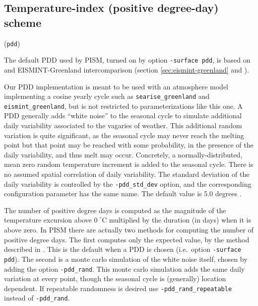 \documentclass[titlepage,letterpaper,final]{scrartcl}
\newcommand{\intextoption}[1]{\texttt{-#1}\optindex{\texttt{-#1}}}
\begin{document}
\subsection{Temperature-index (positive degree-day) scheme}
\label{sec:temp-index-posit}

(\texttt{pdd})     

The default PDD used by PISM, turned on by option \texttt{-surface pdd}, is
based on \cite{CalovGreve05} and EISMINT-Greenland intercomparison (section
\ref{sec:eismint-greenland} and \cite{RitzEISMINT}).

Our PDD implementation is meant to be used with an atmosphere model
implementing a cosine yearly cycle such as \texttt{searise_greenland} and
\texttt{eismint_greenland}, but is not restricted to parameterizations like
this one. A PDD generally adds ``white noise'' to the seasonal cycle to
simulate additional daily variability associated to the vagaries of weather.
This additional random variation is quite significant, as the seasonal cycle
may never reach the melting point but that point may be reached with some
probability, in the presence of the daily variability, and thus melt may occur.
Concretely, a normally-distributed, mean zero random temperature increment is
added to the seasonal cycle. There is no assumed spatial correlation of daily
variability. The standard deviation of the daily variability is controlled by
the \intextoption{pdd_std_dev} option, and the corresponding configuration
parameter has the same name. The default value is 5.0 degrees
\cite{RitzEISMINT}.

The number of positive degree days is computed as the magnitude of the
temperature excursion above $0\!\phantom{|}^\circ \text{C}$ multiplied by the
duration (in days) when it is above zero. In PISM there are actually two
methods for computing the number of positive degree days. The first computes
only the expected value, by the method described in \cite{CalovGreve05}. This
is the default when a PDD is chosen (i.e.~option \texttt{-surface pdd}). The
second is a monte carlo simulation of the white noise itself, chosen by adding
the option \intextoption{pdd_rand}. This monte carlo simulation adds the same
daily variation at every point, though the seasonal cycle is (generally)
location dependent. If repeatable randomness is desired use
\intextoption{pdd_rand_repeatable} instead of \texttt{-pdd_rand}.
\end{document}
